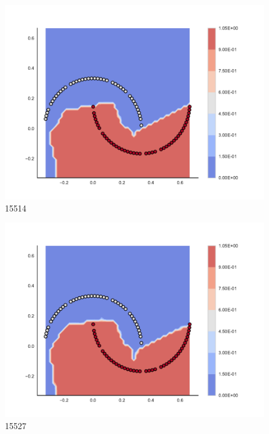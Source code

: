 \begin{subfigure}[b]{0.09\textwidth}
    \includegraphics[clip, trim=2.35cm 1.75cm 4.5cm 0cm,width=\textwidth]{img/convergence/15514.pdf}
    \caption{15514}
    \label{fig:convergence_15514}
\end{subfigure}
%
\begin{subfigure}[b]{0.09\textwidth}
    \includegraphics[clip, trim=2.35cm 1.75cm 4.5cm 0cm,width=\textwidth]{img/convergence/15527.pdf}
    \caption{15527}
    \label{fig:convergence_15527}
\end{subfigure}
%
